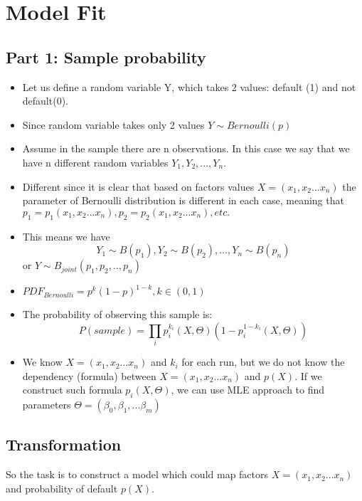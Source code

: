 \documentclass{article}
\begin{document}
\section{Model Fit}
\subsection{Part 1: Sample probability}
\begin{itemize}
    \item Let us define a random variable Y, which takes 2 values: default (1) and not default(0).
    \item Since random variable takes only 2 values $Y \sim Bernoulli(p)$
    \item Assume in the sample there are n observations. In this case we say that we have n different random variables $Y_1, Y_2,...,Y_n$.
    \item Different since it is clear that based on factors values $X = (x_1,x_2...x_n)$ the parameter of Bernoulli distribution is different in each case, meaning that $p_1 = p_1(x_1,x_2...x_n), p_2 = p_2(x_1,x_2...x_n), etc.$
    \item This means we have $$Y_1 \sim B(p_1), Y_2 \sim B(p_2), ... , Y_n \sim B(p_n) $$ or $Y \sim B_{joint}(p_1,p_2,..,p_n)$
    \item $PDF_{Bernoulli} = p^k(1-p)^{1-k}, k\in(0,1)$
    \item The probability of observing this sample is: $$P(sample) = \prod_i p_i^{k_i}(X,\Theta)(1-p_i^{1-k_i}(X,\Theta))$$
    \item We know $X = (x_1,x_2...x_n)$ and $k_i$ for each run, but we do not know the dependency (formula) between $X = (x_1,x_2...x_n)$ and $p(X)$. If we construct such formula $p_i(X,\Theta)$, we can use MLE approach to find parameters $\Theta = (\beta_0, \beta_1,... \beta_m)$ 
\end{itemize}



\subsection{Transformation}
So the task is to construct a model which could map factors $X = (x_1,x_2...x_n)$ and probability of default $p(X)$.
\end{document}
